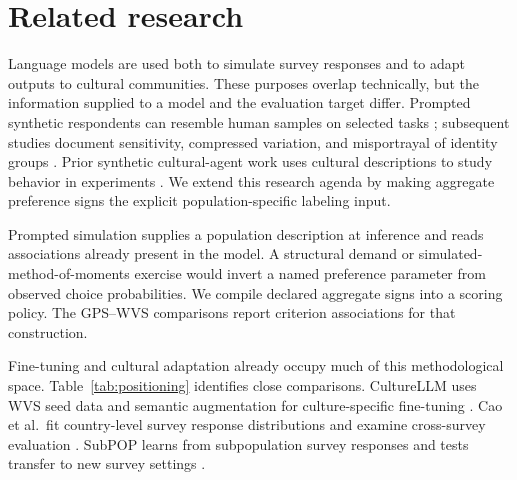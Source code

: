 \section{Related research}\label{sec:litreview}
Language models are used both to simulate survey responses and to adapt outputs to cultural communities. These purposes overlap technically, but the information supplied to a model and the evaluation target differ. Prompted synthetic respondents can resemble human samples on selected tasks \cite{argyle2023,horton2023}; subsequent studies document sensitivity, compressed variation, and misportrayal of identity groups \cite{bisbee2024,boelaert2025,wang2025}. Prior synthetic cultural-agent work uses cultural descriptions to study behavior in experiments \cite{capra2025}. We extend this research agenda by making aggregate preference signs the explicit population-specific labeling input.

Prompted simulation supplies a population description at inference and reads associations already present in the model. A structural demand or simulated-method-of-moments exercise would invert a named preference parameter from observed choice probabilities. We compile declared aggregate signs into a scoring policy. The GPS--WVS comparisons report criterion associations for that construction.

Fine-tuning and cultural adaptation already occupy much of this methodological space. Table~\ref{tab:positioning} identifies close comparisons. CultureLLM uses WVS seed data and semantic augmentation for culture-specific fine-tuning \cite{li2024culture}. Cao et al.\ fit country-level survey response distributions and examine cross-survey evaluation \cite{cao2025}. SubPOP learns from subpopulation survey responses and tests transfer to new survey settings \cite{suh2025}.


